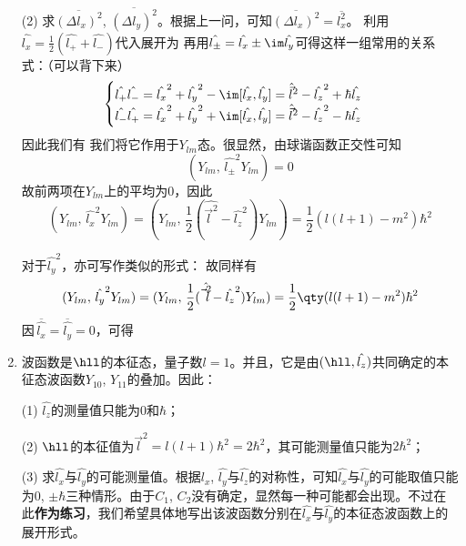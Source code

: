 \begin{enumerate}[label=2.\arabic*]
(2) 求$\overline{(\Delta l_x)^2}$, $\overline{(\Delta l_y)^2}$。根据上一问，可知$\overline{(\Delta l_x)^2}=\overline{l_x^2}$。
利用$\hat{l_x}=\frac{1}{2}(\hat{l_+}+\hat{l_-})$代入展开为
再用$\hat{l_\pm}=\hat{l_x}\pm \im\hat{l_y}$可得这样一组常用的关系式：（可以背下来）
{\color{red}\[\begin{cases}
\hat{l_+}\hat{l_-}=\hat{l_x}^2+\hat{l_y}^2-\im[\hat{l_x},\hat{l_y}] =  \hat{\vec{l}}^2-\hat{l_z}^2+\hbar \hat{l_z}\\
\hat{l_-}\hat{l_+}=\hat{l_x}^2+\hat{l_y}^2+\im[\hat{l_x},\hat{l_y}] =  \hat{\vec{l}}^2-\hat{l_z}^2-\hbar \hat{l_z}
\end{cases}\]}
因此我们有
我们将它作用于$Y_{lm}$态。很显然，由球谐函数正交性可知
\[(Y_{lm},\,\hat{l_\pm}^2 Y_{lm}) = 0\]
故前两项在$Y_{lm}$上的平均为0，因此
\[(Y_{lm},\,\hat{l_x}^2 Y_{lm}) = (Y_{lm},\,\frac{1}{2}(\hat{\vec{l}^2}-\hat{l_z}^2) Y_{lm}) = \frac{1}{2}(l(l+1)-m^2)\hbar^2\]

对于$\hat{l_y}^2$，亦可写作类似的形式：
故同样有
\[(Y_{lm},\,\hat{l_y}^2 Y_{lm}) = (Y_{lm},\,\frac{1}{2}(\hat{\vec{l}^2}-\hat{l_z}^2) Y_{lm}) = \frac{1}{2}\qty(l(l+1)-m^2)\hbar^2\]
因$\,\overline{\hat{l_x}}=\overline{\hat{l_y}}=0$，可得

\item
波函数是$\hll$的本征态，量子数$l=1$。并且，它是由$(\hll,\hat{l_z})$共同确定的本征态波函数$Y_{10}$, $Y_{11}$的叠加。因此：

(1) $\hat{l_z}$的测量值只能为$0$和$\hbar$；

(2) $\hll$的本征值为$\vec{l}^2 = l(l+1)\hbar^2=2\hbar^2$，其可能测量值只能为$2\hbar^2$；

(3) 求$\hat{l_x}$与$\hat{l_y}$的可能测量值。根据$\hat{l_x}$, $\hat{l_y}$与$\hat{l_z}$的对称性，可知$\hat{l_x}$与$\hat{l_y}$的可能取值只能为0, $\pm\hbar$三种情形。由于$C_1$, $C_2$没有确定，显然每一种可能都会出现。不过在此\textbf{作为练习}，我们希望具体地写出该波函数分别在$\hat{l_x}$与$\hat{l_y}$的本征态波函数上的展开形式。


\end{enumerate}
